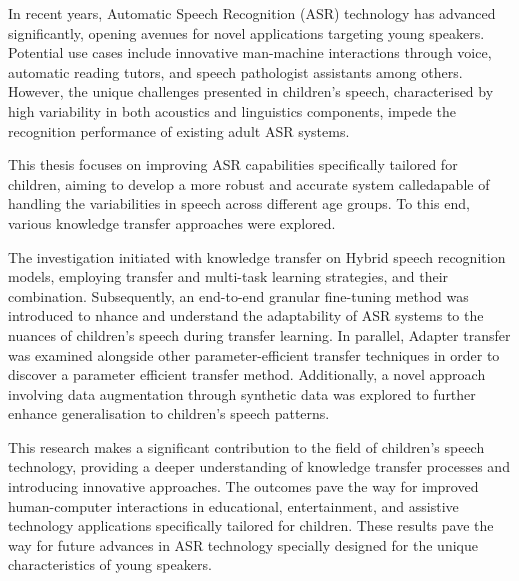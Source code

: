 \noindent In recent years, Automatic Speech Recognition (ASR) technology has advanced significantly, opening avenues for novel applications targeting young speakers. Potential use cases include innovative man-machine interactions through voice, automatic reading tutors, and speech pathologist assistants among others. However, the unique challenges presented in children's speech, characterised by high variability in both acoustics and linguistics components, impede the recognition performance of existing adult ASR systems.

This thesis focuses on improving ASR capabilities specifically tailored for children, aiming to develop a more robust and accurate system calledapable of handling the variabilities in speech across different age groups. To this end, various knowledge transfer approaches were explored.

The investigation initiated with knowledge transfer on Hybrid speech recognition models, employing transfer and multi-task learning strategies, and their combination. Subsequently, an end-to-end granular fine-tuning method was introduced to nhance and understand the adaptability of ASR systems to the nuances of children's speech during transfer learning. In parallel, Adapter transfer was examined alongside other parameter-efficient transfer techniques in order to discover a parameter efficient transfer method. Additionally, a novel approach involving data augmentation through synthetic data was explored to further enhance generalisation to children's speech patterns.

This research makes a significant contribution to the field of children's speech technology, providing a deeper understanding of knowledge transfer processes and introducing innovative approaches. The outcomes pave the way for improved human-computer interactions in educational, entertainment, and assistive technology applications specifically tailored for children. These results pave the way for future advances in ASR technology specially designed for the unique characteristics of young speakers.

\newpage